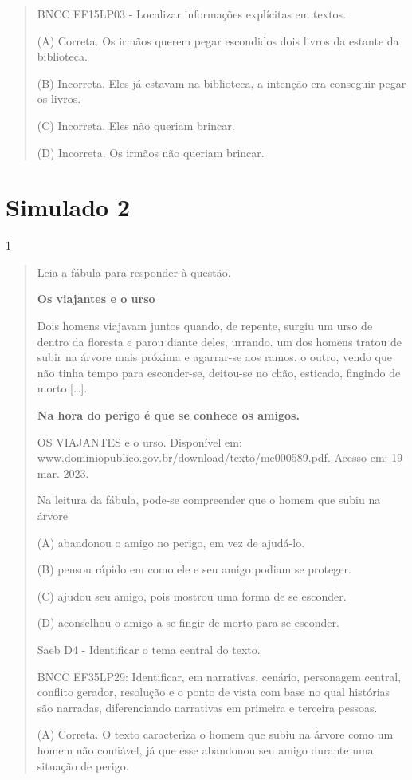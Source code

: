 \begin{escolha}
\begin{quote}
BNCC EF15LP03 - Localizar informações explícitas em textos.

(A) Correta. Os irmãos querem pegar escondidos dois livros da estante da
biblioteca.

(B) Incorreta. Eles já estavam na biblioteca, a intenção era conseguir
pegar os livros.

(C) Incorreta. Eles não queriam brincar.

(D) Incorreta. Os irmãos não queriam brincar.
\end{quote}

\chapter{Simulado 2}

\num{1}

\begin{quote}
Leia a fábula para responder à questão.

\textbf{Os viajantes e o urso}

Dois homens viajavam juntos quando, de repente, surgiu um urso de dentro
da floresta e parou diante deles, urrando. um dos homens tratou de subir
na árvore mais próxima e agarrar-se aos ramos. o outro, vendo que não
tinha tempo para esconder-se, deitou-se no chão, esticado, fingindo de
morto {[}\ldots{}{]}.

\textbf{Na hora do perigo é que se conhece os amigos.}

OS VIAJANTES e o urso. Disponível em:
www.dominiopublico.gov.br/download/texto/me000589.pdf. Acesso em: 19
mar. 2023.

Na leitura da fábula, pode-se compreender que o homem que subiu na
árvore

(A) abandonou o amigo no perigo, em vez de ajudá-lo.

(B) pensou rápido em como ele e seu amigo podiam se proteger.

(C) ajudou seu amigo, pois mostrou uma forma de se esconder.

(D) aconselhou o amigo a se fingir de morto para se esconder.

Saeb D4 - Identificar o tema central do texto.

BNCC EF35LP29: Identificar, em narrativas, cenário, personagem central,
conflito gerador, resolução e o ponto de vista com base no qual
histórias são narradas, diferenciando narrativas em primeira e terceira
pessoas.

(A) Correta. O texto caracteriza o homem que subiu na árvore como um
homem não confiável, já que esse abandonou seu amigo durante uma
situação de perigo.


\end{quote}
\end{escolha}
